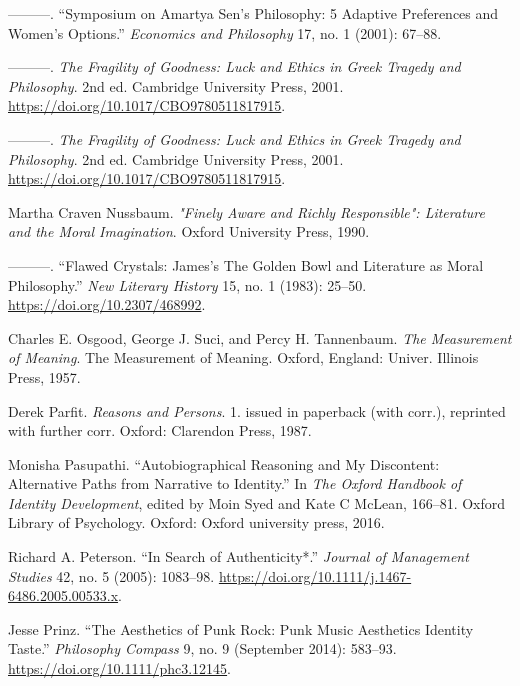 \documentclass[phdthesis,12pt,final,a4paper]{wuthesis}
\newlength{\cslhangindent}
\newenvironment{CSLReferences}[2] %
{\begin{list}{}{%
	\setlength{\itemindent}{0pt}
	\setlength{\leftmargin}{0pt}
	\setlength{\parsep}{0pt}
	\ifodd #1
	\setlength{\leftmargin}{\cslhangindent}
	\setlength{\itemindent}{-1\cslhangindent}
	\fi
	\setlength{\itemsep}{#2\baselineskip}}}
{\end{list}}
\theoremstyle{definition}
\theoremstyle{definition}
\theoremstyle{definition}
\theoremstyle{definition}
\theoremstyle{remark}
\begin{document}
\begin{CSLReferences}{1}{0}
---------. {``Symposium on {Amartya Sen}'s Philosophy: 5 Adaptive Preferences and Women's Options.''} \emph{Economics and Philosophy} 17, no. 1 (2001): 67--88.

---------. \emph{The {Fragility} of {Goodness}: {Luck} and {Ethics} in {Greek Tragedy} and {Philosophy}}. 2nd ed. Cambridge University Press, 2001. \url{https://doi.org/10.1017/CBO9780511817915}.

---------. \emph{The {Fragility} of {Goodness}: {Luck} and {Ethics} in {Greek Tragedy} and {Philosophy}}. 2nd ed. Cambridge University Press, 2001. \url{https://doi.org/10.1017/CBO9780511817915}.

Martha Craven Nussbaum. \emph{"{Finely Aware} and {Richly Responsible}": {Literature} and the {Moral Imagination}}. Oxford University Press, 1990.

---------. {``Flawed {Crystals}: {James}'s {The Golden Bowl} and {Literature} as {Moral Philosophy}.''} \emph{New Literary History} 15, no. 1 (1983): 25--50. \url{https://doi.org/10.2307/468992}.

Charles E. Osgood, George J. Suci, and Percy H. Tannenbaum. \emph{The Measurement of Meaning}. The Measurement of Meaning. Oxford, England: Univer. Illinois Press, 1957.

Derek Parfit. \emph{Reasons and Persons}. 1. issued in paperback (with corr.), reprinted with further corr. Oxford: Clarendon Press, 1987.

Monisha Pasupathi. {``Autobiographical {Reasoning} and {My} {Discontent}: {Alternative Paths} from {Narrative} to {Identity}.''} In \emph{The {Oxford} Handbook of Identity Development}, edited by Moin Syed and Kate C McLean, 166--81. Oxford Library of Psychology. Oxford: Oxford university press, 2016.

Richard A. Peterson. {``In {Search} of {Authenticity}*.''} \emph{Journal of Management Studies} 42, no. 5 (2005): 1083--98. \url{https://doi.org/10.1111/j.1467-6486.2005.00533.x}.

Jesse Prinz. {``The {Aesthetics} of {Punk Rock}: {Punk Music Aesthetics Identity Taste}.''} \emph{Philosophy Compass} 9, no. 9 (September 2014): 583--93. \url{https://doi.org/10.1111/phc3.12145}.


\end{CSLReferences}
\end{document}
